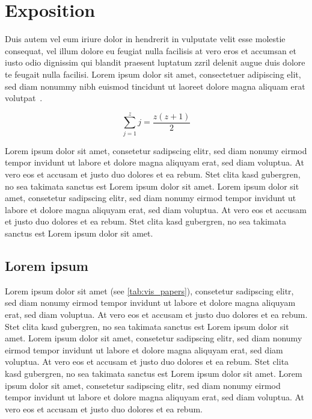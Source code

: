 \documentclass{vgtc}                          %
\begin{document}
\section{Exposition}

Duis autem vel eum iriure dolor in hendrerit in vulputate velit esse
molestie consequat, vel illum dolore eu feugiat nulla facilisis at
vero eros et accumsan et iusto odio dignissim qui blandit praesent
luptatum zzril delenit augue duis dolore te feugait nulla
facilisi. Lorem ipsum dolor sit amet, consectetuer adipiscing elit,
sed diam nonummy nibh euismod tincidunt ut laoreet dolore magna
aliquam erat volutpat~\cite{Kindlmann:1999:SAG}.

\begin{equation}
\sum_{j=1}^{z} j = \frac{z(z+1)}{2}
\end{equation}

Lorem ipsum dolor sit amet, consetetur sadipscing elitr, sed diam
nonumy eirmod tempor invidunt ut labore et dolore magna aliquyam erat,
sed diam voluptua. At vero eos et accusam et justo duo dolores et ea
rebum. Stet clita kasd gubergren, no sea takimata sanctus est Lorem
ipsum dolor sit amet. Lorem ipsum dolor sit amet, consetetur
sadipscing elitr, sed diam nonumy eirmod tempor invidunt ut labore et
dolore magna aliquyam erat, sed diam voluptua. At vero eos et accusam
et justo duo dolores et ea rebum. Stet clita kasd gubergren, no sea
takimata sanctus est Lorem ipsum dolor sit amet.

\subsection{Lorem ipsum}

Lorem ipsum dolor sit amet (see \autoref{tab:vis_papers}), consetetur sadipscing elitr, sed diam
nonumy eirmod tempor invidunt ut labore et dolore magna aliquyam erat,
sed diam voluptua. At vero eos et accusam et justo duo dolores et ea
rebum. Stet clita kasd gubergren, no sea takimata sanctus est Lorem
ipsum dolor sit amet. Lorem ipsum dolor sit amet, consetetur
sadipscing elitr, sed diam nonumy eirmod tempor invidunt ut labore et
dolore magna aliquyam erat, sed diam voluptua. At vero eos et accusam
et justo duo dolores et ea rebum. Stet clita kasd gubergren, no sea
takimata sanctus est Lorem ipsum dolor sit amet. Lorem ipsum dolor sit
amet, consetetur sadipscing elitr, sed diam nonumy eirmod tempor
invidunt ut labore et dolore magna aliquyam erat, sed diam
voluptua. At vero eos et accusam et justo duo dolores et ea
rebum. 
\end{document}
